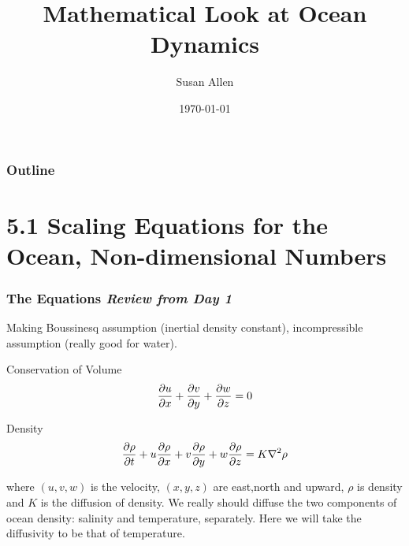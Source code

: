 \documentclass[xcolor=dvipsnames]{beamer}
\title{Mathematical Look at Ocean Dynamics}    %
\author{Susan Allen}                 %
\institute{UBC}      %
\date{\today}                    %
\begin{document}
\begin{frame}
  \titlepage
\end{frame}

\begin{frame}
\frametitle{Outline}
  \tableofcontents
\end{frame}


\section{5.1 Scaling Equations for the Ocean, Non-dimensional Numbers}

\begin{frame}
  \frametitle{The Equations {\it Review from Day 1}}   %

Making Boussinesq assumption (inertial density constant), incompressible assumption (really good for water).

Conservation of Volume\\
\[ \frac {\partial u}{\partial x} + \frac {\partial v}{\partial y} + \frac {\partial w}{\partial z} = 0 \]

Density\\
\[ \frac {\partial \rho}{\partial t} + u \frac {\partial \rho}{\partial x} + v \frac {\partial \rho}{\partial y} + w \frac {\partial \rho}{\partial z} = K \nabla^2 \rho \]

where $(u,v,w)$ is the velocity, $(x,y,z)$ are east,north and upward, $\rho$ is density and $K$ is the diffusion of density.  We really should diffuse the two components of ocean density: salinity and temperature, separately.  Here we will take the diffusivity to be that of temperature.

\end{frame}
\end{document}
